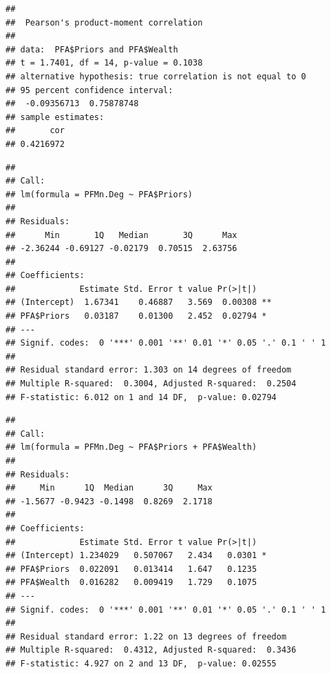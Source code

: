 \documentclass[
  notitlepage,
  onecolumn,
  openany]{book}
\newenvironment{Shaded}{\begin{snugshade}}{\end{snugshade}}
\newcommand{\CommentTok}[1]{\textcolor[rgb]{0.56,0.35,0.01}{\textit{#1}}}
\newcommand{\DocumentationTok}[1]{\textcolor[rgb]{0.56,0.35,0.01}{\textbf{\textit{#1}}}}
\newcommand{\FunctionTok}[1]{\textcolor[rgb]{0.00,0.00,0.00}{#1}}
\newcommand{\NormalTok}[1]{#1}
\newcommand{\OtherTok}[1]{\textcolor[rgb]{0.56,0.35,0.01}{#1}}
\newcommand{\SpecialCharTok}[1]{\textcolor[rgb]{0.00,0.00,0.00}{#1}}
\begin{document}
\begin{verbatim}
## 
##  Pearson's product-moment correlation
## 
## data:  PFA$Priors and PFA$Wealth
## t = 1.7401, df = 14, p-value = 0.1038
## alternative hypothesis: true correlation is not equal to 0
## 95 percent confidence interval:
##  -0.09356713  0.75878748
## sample estimates:
##       cor 
## 0.4216972
\end{verbatim}

\begin{Shaded}
\end{Shaded}

\begin{verbatim}
## 
## Call:
## lm(formula = PFMn.Deg ~ PFA$Priors)
## 
## Residuals:
##      Min       1Q   Median       3Q      Max 
## -2.36244 -0.69127 -0.02179  0.70515  2.63756 
## 
## Coefficients:
##             Estimate Std. Error t value Pr(>|t|)   
## (Intercept)  1.67341    0.46887   3.569  0.00308 **
## PFA$Priors   0.03187    0.01300   2.452  0.02794 * 
## ---
## Signif. codes:  0 '***' 0.001 '**' 0.01 '*' 0.05 '.' 0.1 ' ' 1
## 
## Residual standard error: 1.303 on 14 degrees of freedom
## Multiple R-squared:  0.3004, Adjusted R-squared:  0.2504 
## F-statistic: 6.012 on 1 and 14 DF,  p-value: 0.02794
\end{verbatim}

\begin{Shaded}
\end{Shaded}

\begin{verbatim}
## 
## Call:
## lm(formula = PFMn.Deg ~ PFA$Priors + PFA$Wealth)
## 
## Residuals:
##     Min      1Q  Median      3Q     Max 
## -1.5677 -0.9423 -0.1498  0.8269  2.1718 
## 
## Coefficients:
##             Estimate Std. Error t value Pr(>|t|)  
## (Intercept) 1.234029   0.507067   2.434   0.0301 *
## PFA$Priors  0.022091   0.013414   1.647   0.1235  
## PFA$Wealth  0.016282   0.009419   1.729   0.1075  
## ---
## Signif. codes:  0 '***' 0.001 '**' 0.01 '*' 0.05 '.' 0.1 ' ' 1
## 
## Residual standard error: 1.22 on 13 degrees of freedom
## Multiple R-squared:  0.4312, Adjusted R-squared:  0.3436 
## F-statistic: 4.927 on 2 and 13 DF,  p-value: 0.02555
\end{verbatim}
\end{document}
